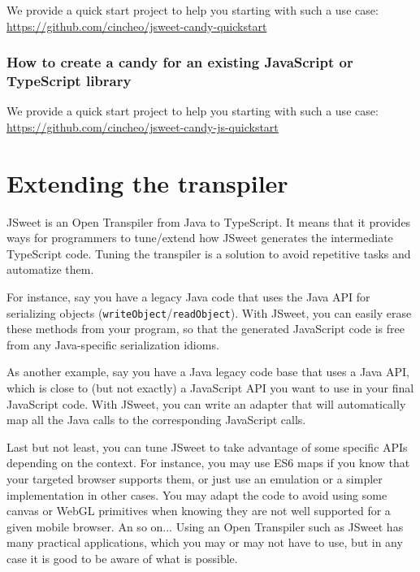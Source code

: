 \documentclass[a4paper]{report}
\begin{document}
We provide a quick start project to help you starting with such a use case: \url{https://github.com/cincheo/jsweet-candy-quickstart}

\subsection{How to create a candy for an existing JavaScript or TypeScript library}

We provide a quick start project to help you starting with such a use case: \url{https://github.com/cincheo/jsweet-candy-js-quickstart}

\chapter{Extending the transpiler}
\label{extending-the-transpiler}

JSweet is an Open Transpiler from Java to TypeScript. It means that it provides ways for programmers to tune/extend how JSweet generates the intermediate TypeScript code. Tuning the transpiler is a solution to avoid repetitive tasks and automatize them.

For instance, say you have a legacy Java code that uses the Java API for serializing objects (\texttt{writeObject}/\texttt{readObject}). With JSweet, you can easily erase these methods from your program, so that the generated JavaScript code is free from any Java-specific serialization idioms. 

As another example, say you have a Java legacy code base that uses a Java API, which is close to (but not exactly) a JavaScript API you want to use in your final JavaScript code. With JSweet, you can write an adapter that will automatically map all the Java calls to the corresponding JavaScript calls. 

Last but not least, you can tune JSweet to take advantage of some specific APIs depending on the context. For instance, you may use ES6 maps if you know that your targeted browser supports them, or just use an emulation or a simpler implementation in other cases. You may adapt the code to avoid using some canvas or WebGL primitives when knowing they are not well supported for a given mobile browser. An so on... Using an Open Transpiler such as JSweet has many practical applications, which you may or may not have to use, but in any case it is good to be aware of what is possible.
\end{document}
